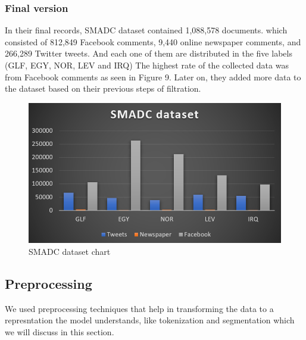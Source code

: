 \documentclass[12pt]{diazessay}
\begin{document}
                \subsubsection{Final version}
                In their final records, SMADC dataset contained 1,088,578 documents. which consisted of 812,849 Facebook comments, 9,440 online newspaper comments, and 266,289 Twitter tweets\cite{alshutayri}. And each one of them are distributed in the five labels (GLF, EGY, NOR, LEV and IRQ) The highest rate of the collected data was from Facebook comments as seen in Figure 9. Later on, they added more data to the dataset based on their previous steps of filtration.
                \begin{figure}[h]
                    \centering
                    \includegraphics[scale=0.85]{Figures/SMADC dataset chart.PNG}
                    \caption{SMADC dataset chart}
                    \label{fig:cmp}
                \end{figure}
                
        
        
            
            
            
        
        \subsection{Preprocessing}
        We used preprocessing techniques that help in transforming the data to a represntation the model understands, like tokenization and segmentation which we will discuss in this section.
        
\end{document}
